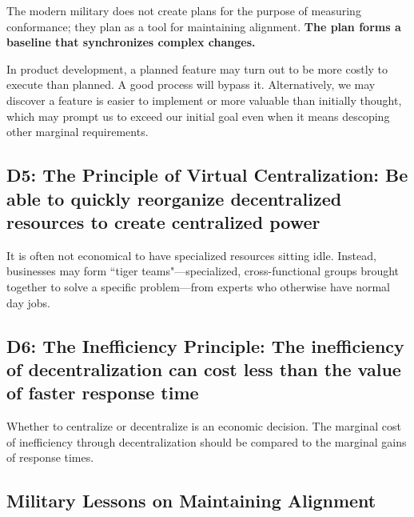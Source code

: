 \documentclass{article}
\begin{document}
\begin{multicols}{2}
The modern military does not create plans for the purpose of measuring conformance; they plan as a tool for maintaining alignment. \textbf{The plan forms a baseline that synchronizes complex changes.}

In product development, a planned feature may turn out to be more costly to execute than planned. A good process will bypass it. Alternatively, we may discover a feature is easier to implement or more valuable than initially thought, which may prompt us to exceed our initial goal even when it means descoping other marginal requirements.

\subsection{D5: The Principle of Virtual Centralization: Be able to quickly reorganize decentralized resources to create centralized power}

It is often not economical to have specialized resources sitting idle. Instead, businesses may form ``tiger teams"---specialized, cross-functional groups brought together to solve a specific problem---from experts who otherwise have normal day jobs.

\subsection{D6: The Inefficiency Principle: The inefficiency of decentralization can cost less than the value of faster response time}

Whether to centralize or decentralize is an economic decision. The marginal cost of inefficiency through decentralization should be compared to the marginal gains of response times.

\end{multicols}

\begin{center}
  \section{Military Lessons on Maintaining Alignment}
\end{center}
  
\end{document}
